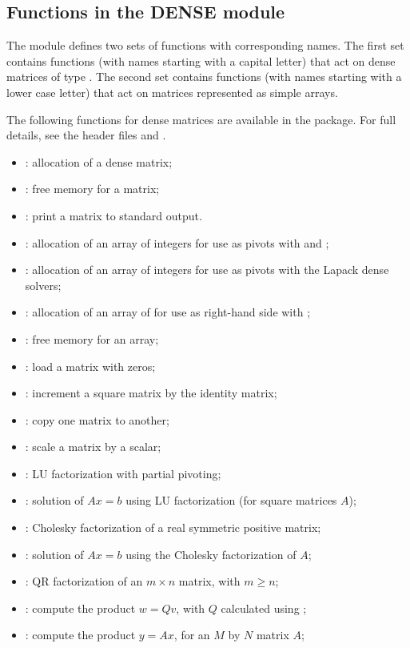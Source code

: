 \subsection{Functions in the DENSE module}\label{ss:dense}

The {\dense} module defines two sets of functions with corresponding names.
The first set contains functions (with names starting with a capital letter)
that act on dense matrices of type .  The second set contains functions
(with names starting with a lower case letter) that act on matrices represented 
as simple arrays.

The following functions for  dense matrices are available
in the {\dense} package.  For full details, see the header files
 and .
\begin{itemize}
\item {}: allocation of a  dense matrix;
\item {}: free memory for a  matrix;
\item {}: print a  matrix to standard output.
\item {}: allocation of an array of  integers for use
  as pivots with  and ;
\item {}: allocation of an array of  integers for use
  as pivots with the Lapack dense solvers;
\item {}: allocation of an array of  for use
  as right-hand side with ;
\item {}: free memory for an array;
\item {}: load a matrix with zeros;
\item {}: increment a square matrix by the identity matrix;
\item {}: copy one matrix to another;
\item {}: scale a matrix by a scalar;
\item {}: LU factorization with partial pivoting;
\item {}: solution of $Ax = b$ using LU factorization (for square matrices $A$);
\item {}: Cholesky factorization of a real symmetric positive matrix;
\item {}: solution of $Ax = b$ using the Cholesky factorization of $A$;
\item {}: QR factorization of an $m \times n$ matrix, with $m \ge n$;
\item {}: compute the product $w = Qv$, with $Q$ calculated using ;
\item {}: compute the product $y = Ax$, for an $M$ by $N$ matrix $A$;
\end{itemize}
